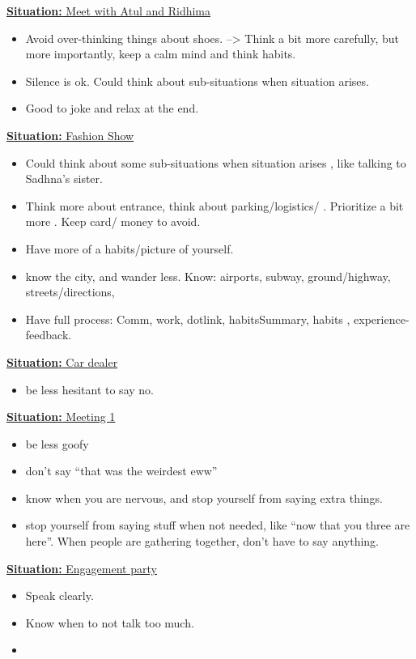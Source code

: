 \documentclass[11pt]{article}
\newcommand{\newSituation}[1]{\underline{\textbf{Situation:} #1} }
\begin{document}
\newSituation{Meet with Atul and Ridhima} 
\begin{itemize} 
\item Avoid over-thinking things about shoes. --> Think a bit more carefully, but more importantly, keep a calm mind and think habits. 
\item Silence is ok.  Could think about sub-situations when situation arises. 
\item Good to joke and relax at the end. 
\end{itemize} 

\newSituation{Fashion Show} 
\begin{itemize} 
\item Could think about some sub-situations when situation arises , like talking to Sadhna's sister. 
\item Think more about entrance, think about parking/logistics/   .  Prioritize a bit more .  Keep card/ money to avoid. 
\item Have more of a habits/picture of yourself. 
\item know the city, and wander less. Know: airports, subway, ground/highway, streets/directions, 
\item Have full process: Comm, work, dotlink, habitsSummary, habits , experience-feedback. 
\end{itemize}

\newSituation{Car dealer} 
\begin{itemize} 
\item be less hesitant to say no. 
\end{itemize} 


\newSituation{Meeting 1} 
\begin{itemize} 
\item be less goofy
\item don't say ``that was the weirdest eww'' 
\item know when you are nervous, and stop yourself from saying extra things. 
\item stop yourself from saying stuff when not needed, like ``now that you three are here''. When people are gathering together, don't have to say anything. 
\end{itemize} 


\newSituation{Engagement party} 
\begin{itemize} 
\item Speak clearly.
\item Know when to not talk too much. 
\item 
\end{itemize} 
\end{document}
